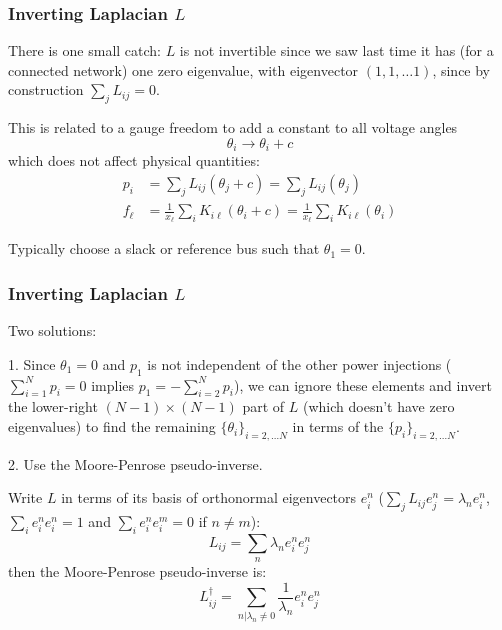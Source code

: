 \documentclass[10pt,aspectratio=169,dvipsnames]{beamer}
\def\l{\lambda}
\begin{document}
\begin{frame}
  \frametitle{Inverting Laplacian $L$}

  There is one small catch: $L$ is \alert{not invertible} since we saw last
  time it has (for a connected network) one zero eigenvalue, with
  eigenvector $(1,1, \dots 1)$, since by construction $\sum_j L_{ij} =
  0$.

  This is related to a gauge freedom to add a constant to all voltage angles
  \begin{equation*}
    \theta_i \to \theta_i + c
  \end{equation*}
  which does not affect physical quantities:
    \begin{align*}
      p_i & = \sum_{j} L_{ij} (\theta_j+ c) = \sum_{j} L_{ij} (\theta_j)  \\
     f_\ell  & = \frac{1}{x_\ell}\sum_{i} K_{i\ell}( \theta_i  + c) = \frac{1}{x_\ell}\sum_{i} K_{i\ell}( \theta_i )
    \end{align*}

    Typically choose a \alert{slack} or \alert{reference bus} such that  $\theta_1 = 0$.


\end{frame}

\begin{frame}
  \frametitle{Inverting Laplacian $L$}

  Two solutions:

  1. Since $\theta_1 = 0$ and $p_1$ is not independent of the other
  power injections ($\sum_{i=1}^N p_i = 0$ implies $p_1 = -
  \sum_{i=2}^N p_i$), we can ignore these elements and invert
  the lower-right $(N-1) \times (N-1)$ part of $L$ (which doesn't have zero eigenvalues) to find the
  remaining $\{\theta_i\}_{i=2,\dots N}$ in terms of the
  $\{p_i\}_{i=2,\dots N}$.

  2. Use the Moore-Penrose pseudo-inverse.

  Write $L$ in terms of its basis of orthonormal eigenvectors $e^n_i$ ($\sum_j L_{ij} e^n_j = \l_n e^n_i$, $\sum_i e^n_i e^n_i = 1$ and  $\sum_i e^n_i e^m_i = 0$ if $n \neq m$):
  \begin{equation*}
    L_{ij} = \sum_n \l_n e^n_i e^n_j
  \end{equation*}
  then the Moore-Penrose pseudo-inverse is:
  \begin{equation*}
    L^\dagger_{ij} = \sum_{n | \l_n \neq 0} \frac{1}{\l_n} e^n_i e^n_j
  \end{equation*}



\end{frame}
\end{document}
